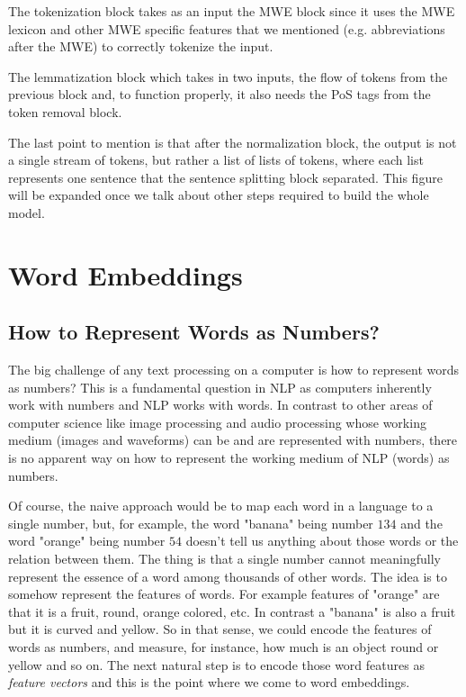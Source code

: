 \documentclass[12pt]{article}
\numberwithin{equation}{section}
\begin{document}
\begin{spacing}{1.5}
	The tokenization block takes as an input the MWE block since it uses the MWE lexicon and other MWE specific features that we mentioned (e.g. abbreviations after the MWE) to correctly tokenize the input.
	
	The lemmatization block which takes in two inputs, the flow of tokens from the previous block and, to function properly, it also needs the PoS tags from the token removal block.
	
	The last point to mention is that after the normalization block, the output is not a single stream of tokens, but rather a list of lists of tokens, where each list represents one sentence that the sentence splitting block separated.
	This figure will be expanded once we talk about other steps required to build the whole model. 

	
	\newpage 
	\section{Word Embeddings}
	\subsection{How to Represent Words as Numbers?}
	The big challenge of any text processing on a computer is how to represent words as numbers? This is a fundamental question in NLP as computers inherently work with numbers and NLP works with words. In contrast to other areas of computer science like image processing and audio processing whose working medium (images and waveforms) can be and are represented with numbers, there is no apparent way on how to represent the working medium of NLP (words) as numbers.
	
	Of course, the naive approach would be to map each word in a language to a single number, but, for example, the word "banana" being number $134$ and the word "orange" being number $54$ doesn't tell us anything about those words or the relation between them. The thing is that a single number cannot meaningfully represent the essence of a word among thousands of other words. The idea is to somehow represent the features of words. For example features of "orange" are that it is a fruit, round, orange colored, etc. In contrast a "banana" is also a fruit but it is curved and yellow. So in that sense, we could encode the features of words as numbers, and measure, for instance, how much is an object round or yellow and so on. The next natural step is to encode those word features as \textit{feature vectors} and this is the point where we come to word embeddings.
	

\end{spacing}
\end{document}
